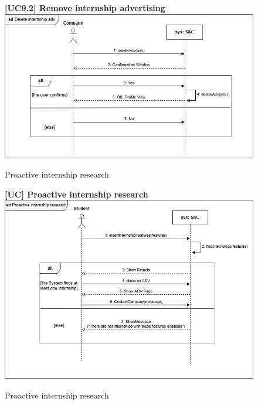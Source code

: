 \begin{figure}[H]
\textbf{[UC9.2] Remove internship advertising}\newline\newline
\includegraphics[width=15cm]{Images/UC_diagram/RASD-UC10.drawio.png}
    \caption{Proactive internship research}
\end{figure}

\begin{figure}[H]
\textbf{[UC\nextUCDiagr] Proactive internship research}\newline\newline
\includegraphics[width=15cm]{Images/UC_diagram/RASD-UC11.drawio.png}
    \caption{Proactive internship research}
\end{figure}

